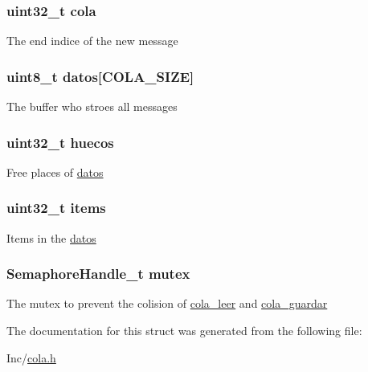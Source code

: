 \subsubsection[{\texorpdfstring{cola}{cola}}]{\setlength{\rightskip}{0pt plus 5cm}uint32\+\_\+t cola}\hypertarget{structt__cola_ae6eec6efa2dd9d70da13b2a435c3de27}{}\label{structt__cola_ae6eec6efa2dd9d70da13b2a435c3de27}
The end indice of the new message 
\subsubsection[{\texorpdfstring{datos}{datos}}]{\setlength{\rightskip}{0pt plus 5cm}uint8\+\_\+t datos\mbox{[}{\bf C\+O\+L\+A\+\_\+\+S\+I\+ZE}\mbox{]}}\hypertarget{structt__cola_a8eaaf6d0a3ebef35b2d6c94e9a63bf3d}{}\label{structt__cola_a8eaaf6d0a3ebef35b2d6c94e9a63bf3d}
The buffer who stroes all messages 
\subsubsection[{\texorpdfstring{huecos}{huecos}}]{\setlength{\rightskip}{0pt plus 5cm}uint32\+\_\+t huecos}\hypertarget{structt__cola_a326c5b8fc3633ed405339faf05e5a552}{}\label{structt__cola_a326c5b8fc3633ed405339faf05e5a552}
Free places of \hyperlink{structt__cola_a8eaaf6d0a3ebef35b2d6c94e9a63bf3d}{datos} 
\subsubsection[{\texorpdfstring{items}{items}}]{\setlength{\rightskip}{0pt plus 5cm}uint32\+\_\+t items}\hypertarget{structt__cola_a3691abaa51fe86a073eaabdd1c39b74c}{}\label{structt__cola_a3691abaa51fe86a073eaabdd1c39b74c}
Items in the \hyperlink{structt__cola_a8eaaf6d0a3ebef35b2d6c94e9a63bf3d}{datos} 
\subsubsection[{\texorpdfstring{mutex}{mutex}}]{\setlength{\rightskip}{0pt plus 5cm}Semaphore\+Handle\+\_\+t mutex}\hypertarget{structt__cola_afc659d089f5608a17e8650e59a7e26fc}{}\label{structt__cola_afc659d089f5608a17e8650e59a7e26fc}
The mutex to prevent the colision of \hyperlink{group___cola___exported___functions___group2_ga12fe948f259d8c9d7a390a76c416b55c}{cola\+\_\+leer} and \hyperlink{group___cola___exported___functions___group2_gaa639dba8be8eec5d19259aeb8de2cd7a}{cola\+\_\+guardar} 

The documentation for this struct was generated from the following file\+:\begin{DoxyCompactItemize}
\item 
Inc/\hyperlink{cola_8h}{cola.\+h}\end{DoxyCompactItemize}
